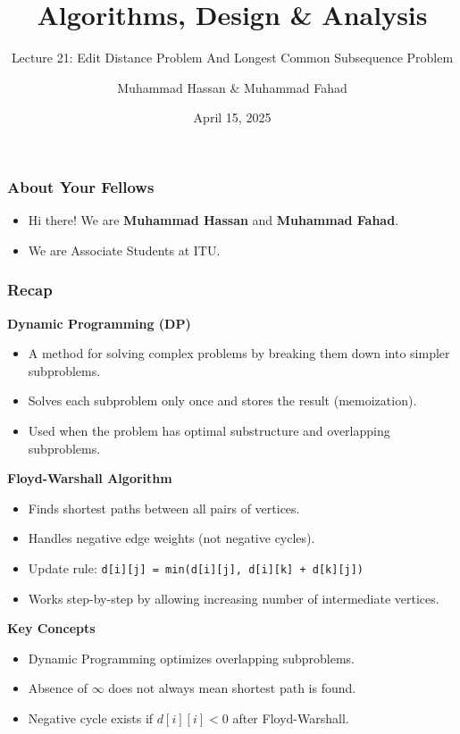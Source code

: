 \documentclass[10pt,aspectratio=43]{beamer}
\title{Algorithms, Design \& Analysis}
\subtitle{Lecture 21: Edit Distance Problem And Longest Common Subsequence Problem}
\author[BSCS23011 \& BSCS23047]{Muhammad Hassan \& Muhammad Fahad}
\institute[ITU]{Information Technology University}
\date{April 15, 2025}
\begin{document}
\begin{frame}
    \titlepage
\end{frame}


\begin{frame}
    \frametitle{About Your Fellows}
    \begin{itemize}
        \item Hi there! We are \textbf{Muhammad Hassan} and \textbf{Muhammad Fahad}.
        \item We are Associate Students at ITU.
    \end{itemize}
    
\end{frame}

\begin{frame}
   \frametitle{Recap}

   \textbf{Dynamic Programming (DP)}\\
   \begin{itemize}
       \item A method for solving complex problems by breaking them down into simpler subproblems.
       \item Solves each subproblem only once and stores the result (memoization).
       \item Used when the problem has optimal substructure and overlapping subproblems.
   \end{itemize}

   \textbf{Floyd-Warshall Algorithm}\\
   \begin{itemize}
       \item Finds shortest paths between all pairs of vertices.
       \item Handles negative edge weights (not negative cycles).
       \item Update rule: \texttt{d[i][j] = min(d[i][j], d[i][k] + d[k][j])}
       \item Works step-by-step by allowing increasing number of intermediate vertices.
   \end{itemize}

   \textbf{Key Concepts}\\
   \begin{itemize}
       \item Dynamic Programming optimizes overlapping subproblems.
       \item Absence of $\infty$ does not always mean shortest path is found.
       \item Negative cycle exists if $d[i][i] < 0$ after Floyd-Warshall.
   \end{itemize}

\end{frame}
\end{document}

